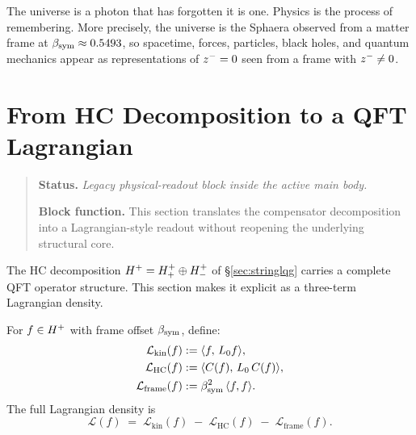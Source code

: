 \begin{remark}
The universe is a photon that has forgotten it is one. Physics is the
process of remembering. More precisely, the universe is the Sphaera
observed from a matter frame at $\beta_{\mathrm{sym}}\approx 0.5493$, so spacetime,
forces, particles, black holes, and quantum mechanics appear as
representations of $z^-=0$ seen from a frame with $z^-\neq 0$.
\end{remark}



\section{From HC Decomposition to a QFT Lagrangian}
\begin{quote}\small
\noindent\textbf{Status.} \emph{Legacy physical-readout block inside the active main body.}\par
\noindent\textbf{Block function.} This section translates the compensator decomposition into a Lagrangian-style readout without reopening the underlying structural core.
\end{quote}
\label{sec:lagrangian}

\begin{remark}
The HC decomposition $H^+=H^+_+\oplus H^+_-$ of \S\ref{sec:stringlqg}
carries a complete QFT operator structure.
This section makes it explicit as a three-term Lagrangian density.
\end{remark}

\begin{definition}\label{def:lagrangian}
For $f\in H^+$ with frame offset $\beta_{\mathrm{sym}}$, define:
\begin{align}
  \mathcal{L}_{\mathrm{kin}}(f)
    &:= \langle f,\,L_0 f\rangle,\label{eq:L_kin}\\
  \mathcal{L}_{\mathrm{HC}}(f)
    &:= \langle C(f),\,L_0\,C(f)\rangle,\label{eq:L_HC}\\
  \mathcal{L}_{\mathrm{frame}}(f)
    &:= \beta_{\mathrm{sym}}^2\,\langle f,f\rangle.\label{eq:L_frame}
\end{align}
The full Lagrangian density is
\[
  \mathcal{L}(f)
  \;=\;
  \mathcal{L}_{\mathrm{kin}}(f)
  \;-\;
  \mathcal{L}_{\mathrm{HC}}(f)
  \;-\;
  \mathcal{L}_{\mathrm{frame}}(f).
\]
\end{definition}

